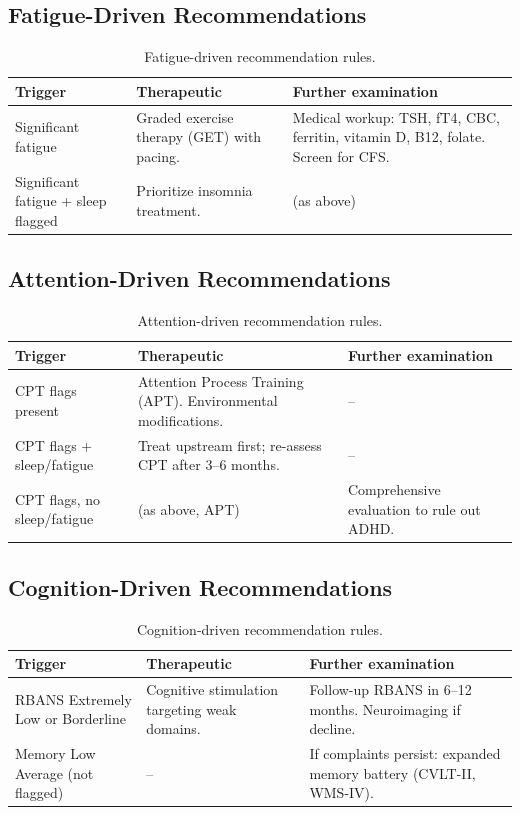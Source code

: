 \subsection{Fatigue-Driven Recommendations}

\begin{table}[H]
\centering
\caption{Fatigue-driven recommendation rules.}
\label{tab:rec-fatigue}
\begin{tabular}{p{3.5cm}p{5.0cm}p{4.5cm}}
\toprule
\textbf{Trigger} & \textbf{Therapeutic} & \textbf{Further examination} \\
\midrule
Significant fatigue & Graded exercise therapy (GET) with pacing. & Medical workup: TSH, fT4, CBC, ferritin, vitamin D, B12, folate. Screen for CFS. \\
\addlinespace
Significant fatigue + sleep flagged & Prioritize insomnia treatment. & (as above) \\
\bottomrule
\end{tabular}
\end{table}

\subsection{Attention-Driven Recommendations}

\begin{table}[H]
\centering
\caption{Attention-driven recommendation rules.}
\label{tab:rec-attention}
\begin{tabular}{p{3.5cm}p{5.0cm}p{4.5cm}}
\toprule
\textbf{Trigger} & \textbf{Therapeutic} & \textbf{Further examination} \\
\midrule
CPT flags present & Attention Process Training (APT). Environmental modifications. & -- \\
\addlinespace
CPT flags + sleep/fatigue & Treat upstream first; re-assess CPT after 3--6 months. & -- \\
\addlinespace
CPT flags, no sleep/fatigue & (as above, APT) & Comprehensive evaluation to rule out ADHD. \\
\bottomrule
\end{tabular}
\end{table}

\subsection{Cognition-Driven Recommendations}

\begin{table}[H]
\centering
\caption{Cognition-driven recommendation rules.}
\label{tab:rec-cognition}
\begin{tabular}{p{3.5cm}p{5.0cm}p{4.5cm}}
\toprule
\textbf{Trigger} & \textbf{Therapeutic} & \textbf{Further examination} \\
\midrule
RBANS Extremely Low or Borderline & Cognitive stimulation targeting weak domains. & Follow-up RBANS in 6--12 months. Neuroimaging if decline. \\
\addlinespace
Memory Low Average (not flagged) & -- & If complaints persist: expanded memory battery (CVLT-II, WMS-IV). \\
\bottomrule
\end{tabular}
\end{table}

